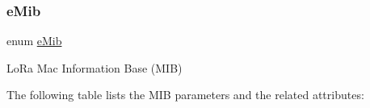 \mbox{\label{group__LORAMAC_ga32ea83d13a3f5bb4b3ec2ace2319ab61}} 
\subsubsection{\texorpdfstring{e\+Mib}{eMib}}
{\footnotesize\ttfamily enum \hyperlink{group__LORAMAC_ga32ea83d13a3f5bb4b3ec2ace2319ab61}{e\+Mib}}

Lo\+Ra Mac Information Base (M\+IB)

The following table lists the M\+IB parameters and the related attributes\+:


